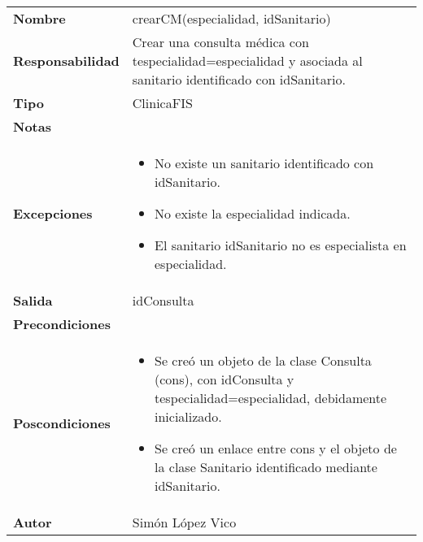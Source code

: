\documentclass[11pt,a4paper]{article}
\begin{document}
\begin{table}[H]
	\centering
	\label{my-label}
	\begin{tabularx}{\textwidth}{l|X}
		\textbf{Nombre}          & crearCM(especialidad, idSanitario) \\
		\textbf{Responsabilidad} & Crear una consulta médica con tespecialidad=especialidad y asociada al sanitario identificado con idSanitario. \\
		\textbf{Tipo}            & ClinicaFIS \\
		\textbf{Notas}           & \\
		\textbf{Excepciones}     &
		\begin{itemize}
			\item No existe un sanitario identificado con idSanitario.
			\item No existe la especialidad indicada.
			\item El sanitario idSanitario no es especialista en especialidad.
		\end{itemize} \\
		\textbf{Salida}          & idConsulta \\
		\textbf{Precondiciones}  & \\
		\textbf{Poscondiciones}  & 
		\begin{itemize}
			\item Se creó un objeto de la clase Consulta (cons), con idConsulta y tespecialidad=especialidad, debidamente inicializado.
			\item Se creó un enlace entre cons y el objeto de la clase Sanitario identificado mediante idSanitario.
			
		\end{itemize} \\
		\textbf{Autor}			 & Simón López Vico
	\end{tabularx}
\end{table}
\end{document}
